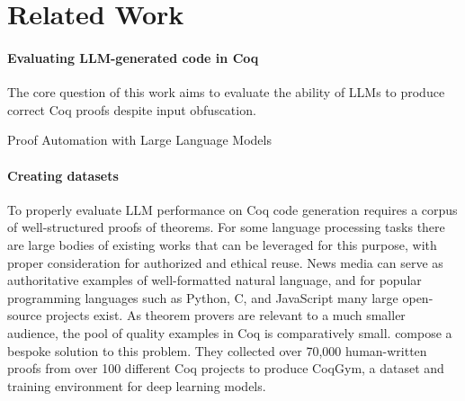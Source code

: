 
\section{Related Work}
\label{sec:related-work}

\paragraph{Evaluating LLM-generated code in Coq}

The core question of this work aims to evaluate
the ability of LLMs to produce correct Coq proofs
despite input obfuscation.

Proof Automation with Large Language Models\cite{proofautomationwithllms}



\paragraph{Creating datasets}
To properly evaluate LLM performance on
Coq code generation requires a corpus of well-structured
proofs of theorems. For some language processing tasks
there are large bodies of existing works that can be leveraged for this purpose, 
with proper consideration for authorized and ethical reuse.
News media can serve as authoritative examples of
well-formatted natural language, and for popular programming
languages such as Python, C, and JavaScript many large
open-source projects exist.
As theorem provers are relevant to a much smaller audience, the pool of quality examples in Coq is
comparatively small.
\citet{learningtoprove} compose a bespoke solution
to this problem. They collected over 70,000 human-written proofs
from over 100 different Coq projects to produce CoqGym,
a dataset and training environment for deep learning models.



